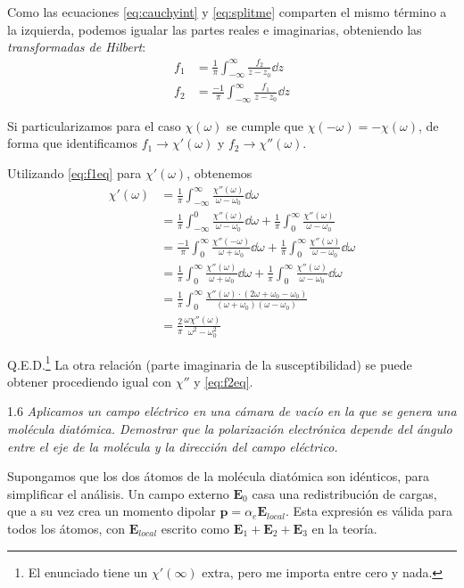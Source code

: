 \documentclass{tufte-book}
\begin{document}
Como las ecuaciones \eqref{eq:cauchyint} y \eqref{eq:splitme}
comparten el mismo término a la izquierda, podemos igualar las partes
reales e imaginarias, obteniendo las \emph{transformadas de Hilbert}:
\begin{align}
  f_1 &= \frac{1}{π} \int_{-∞}^∞ \frac{f_2}{z-z_0} \dd{z} \label{eq:f1eq} \\
  f_2 &= \frac{-1}{π} \int_{-∞}^∞ \frac{f_1}{z-z_0} \dd{z} \label{eq:f2eq}
\end{align}

Si particularizamos para el caso $χ(ω)$ se cumple que $χ(-ω)=-χ(ω)$,
de forma que identificamos $f_1 → χ'(ω)$ y $f_2 → χ''(ω)$.

Utilizando \eqref{eq:f1eq} para $χ'(ω)$, obtenemos
\begin{equation}
  \begin{split}
    χ'(ω) &= \frac{1}{π} \int_{-∞}^∞ \frac{χ''(ω)}{ω-ω_0} \dd{ω} \\
    &= \frac{1}{π} \int_{-∞}^0 \frac{χ''(ω)}{ω-ω_0} \dd{ω}
    + \frac{1}{π} \int_0^{∞} \frac{χ''(ω)}{ω-ω_0} \\
    &= \frac{-1}{π} \int_0^∞ \frac{χ''(-ω)}{ω+ω_0} \dd{ω}
    + \frac{1}{π} \int_0^∞ \frac{χ''(ω)}{ω-ω_0} \dd{ω} \\
    &= \frac{1}{π} \int_0^∞ \frac{χ''(ω)}{ω+ω_0} \dd{ω}
    + \frac{1}{π} \int_0^∞ \frac{χ''(ω)}{ω-ω_0} \dd{ω} \\
    &= \frac{1}{π} \int_0^∞ \frac{χ''(ω)⋅(2ω+ω_0-ω_0)}{(ω+ω_0)(ω-ω_0)}
    \\
    &= \frac{2}{π} \frac{ωχ''(ω)}{ω^2-ω_0^2}
  \end{split}
\end{equation}

Q.E.D.\footnote{
  El enunciado tiene un $χ'(∞)$ extra, pero me importa entre cero y nada.
} La otra relación (parte imaginaria de la susceptibilidad) se puede
obtener procediendo igual con $χ''$ y \eqref{eq:f2eq}.

\begin{tcolorbox}[halign=left]
  \lettrine[lines=2]{\color{ExerciseNumberColor}1.6}{}
  \emph{
    Aplicamos un campo eléctrico en una cámara de vacío en la que se genera
    una molécula diatómica. Demostrar que la polarización electrónica
    depende del ángulo entre el eje de la molécula y la dirección del
    campo eléctrico.
  }
\end{tcolorbox}


Supongamos que los dos átomos de la molécula diatómica son idénticos,
para simplificar el análisis. Un campo externo $\symbf{E}_0$ casa una
redistribución de cargas, que a su vez crea un momento dipolar
$\symbf{p} = α_e \symbf{E}_\mathit{local}$. Esta expresión es válida
para todos los átomos, con $\symbf{E}_\mathit{local}$ escrito como
$\symbf{E}_1+\symbf{E}_2+\symbf{E}_3$ en la teoría.
\end{document}
